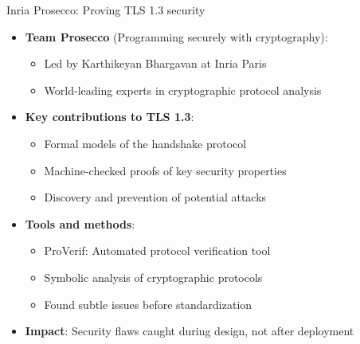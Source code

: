 \documentclass[aspectratio=169, lualatex, handout]{beamer}
\begin{document}
\begin{frame}{Inria Prosecco: Proving TLS 1.3 security}
	\begin{itemize}[<+->]
		\item \textbf{Team Prosecco} (Programming securely with cryptography):
		      \begin{itemize}
			      \item Led by Karthikeyan Bhargavan at Inria Paris
			      \item World-leading experts in cryptographic protocol analysis
		      \end{itemize}
		\item \textbf{Key contributions to TLS 1.3}:
		      \begin{itemize}
			      \item Formal models of the handshake protocol
			      \item Machine-checked proofs of key security properties
			      \item Discovery and prevention of potential attacks
		      \end{itemize}
		\item \textbf{Tools and methods}:
		      \begin{itemize}
			      \item ProVerif: Automated protocol verification tool
			      \item Symbolic analysis of cryptographic protocols
			      \item Found subtle issues before standardization
		      \end{itemize}
		\item \textbf{Impact}: Security flaws caught during design, not after deployment
	\end{itemize}
\end{frame}
\end{document}
